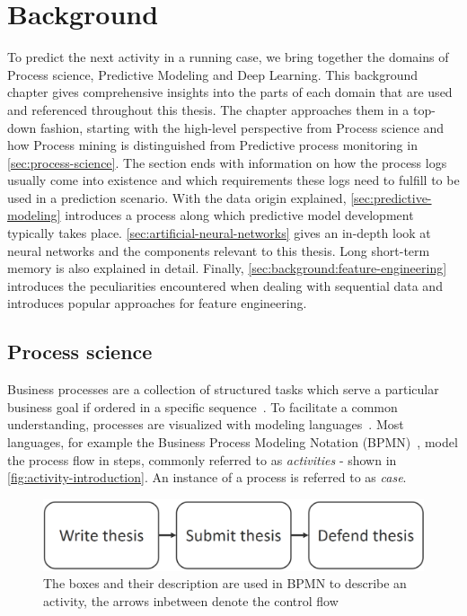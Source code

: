 \chapter{Background}\label{chap:background}
To predict the next activity in a running case, we bring together the domains of Process science, Predictive Modeling and Deep Learning. This background chapter gives comprehensive insights into the parts of each domain that are used and referenced throughout this thesis. The chapter approaches them in a top-down fashion, starting with the high-level perspective from Process science and how Process mining is distinguished from Predictive process monitoring in \autoref{sec:process-science}. The section ends with information on how the process logs usually come into existence and which requirements these logs need to fulfill to be used in a prediction scenario.
With the data origin explained, \autoref{sec:predictive-modeling} introduces a process along which predictive model development typically takes place.
\autoref{sec:artificial-neural-networks} gives an in-depth look at neural networks and the components relevant to this thesis.
Long short-term memory is also explained in detail.
Finally, \autoref{sec:background:feature-engineering} introduces the peculiarities encountered when dealing with sequential data and introduces popular approaches for feature engineering.

\section{Process science}\label{sec:process-science}
Business processes are a collection of structured tasks which serve a particular business goal if ordered in a specific sequence~\cite{weske2012business}. To facilitate a common understanding, processes are visualized with modeling languages~\cite{panagacos2012ultimate}. Most languages, for example the Business Process Modeling Notation (BPMN)~\cite{bpmn2.0}, model the process flow in steps, commonly referred to as \textit{activities} - shown in \autoref{fig:activity-introduction}. An instance of a process is referred to as \textit{case}.

\begin{figure}[!htb]
    \centering
    \includegraphics[width=.75\textwidth]{gfx/activity-sequence.png}
    \caption[Control flow in BPMN]{The boxes and their description are used in BPMN to describe an activity, the arrows inbetween denote the control flow}
    \label{fig:activity-introduction}
\end{figure}


